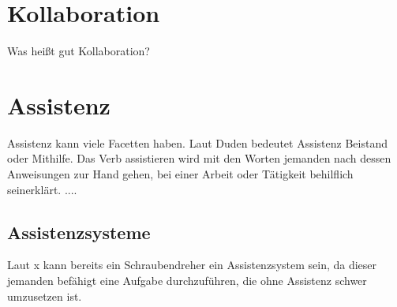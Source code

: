\section{Kollaboration}
Was heißt gut Kollaboration?



\section{Assistenz}
Assistenz kann viele Facetten haben. Laut Duden bedeutet Assistenz Beistand oder Mithilfe. Das Verb assistieren wird mit den Worten \glqq jemanden nach dessen Anweisungen zur Hand gehen, bei einer Arbeit oder Tätigkeit behilflich sein\grqq erklärt.
....



\subsection{Assistenzsysteme}
Laut x kann bereits ein Schraubendreher ein Assistenzsystem sein, da dieser jemanden befähigt eine Aufgabe durchzuführen, die ohne Assistenz schwer umzusetzen ist.